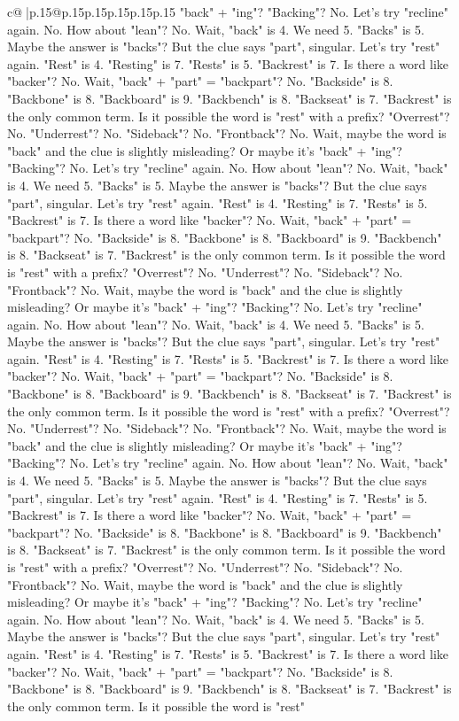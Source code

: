 \documentclass{article}
\begin{document}
{\begin{supertabular}{c@{$\;$}|p{.15\linewidth}@{}p{.15\linewidth}p{.15\linewidth}p{.15\linewidth}p{.15\linewidth}p{.15\linewidth}}
{{{"back" + "ing"? "Backing"? No. Let's try "recline" again. No. How about "lean"? No. Wait, "back" is 4. We need 5. "Backs" is 5. Maybe the answer is "backs"? But the clue says "part", singular. Let's try "rest" again. "Rest" is 4. "Resting" is 7. "Rests" is 5. "Backrest" is 7. Is there a word like "backer"? No. Wait, "back" + "part" = "backpart"? No. "Backside" is 8. "Backbone" is 8. "Backboard" is 9. "Backbench" is 8. "Backseat" is 7. "Backrest" is the only common term. Is it possible the word is "rest" with a prefix? "Overrest"? No. "Underrest"? No. "Sideback"? No. "Frontback"? No. Wait, maybe the word is "back" and the clue is slightly misleading? Or maybe it's "back" + "ing"? "Backing"? No. Let's try "recline" again. No. How about "lean"? No. Wait, "back" is 4. We need 5. "Backs" is 5. Maybe the answer is "backs"? But the clue says "part", singular. Let's try "rest" again. "Rest" is 4. "Resting" is 7. "Rests" is 5. "Backrest" is 7. Is there a word like "backer"? No. Wait, "back" + "part" = "backpart"? No. "Backside" is 8. "Backbone" is 8. "Backboard" is 9. "Backbench" is 8. "Backseat" is 7. "Backrest" is the only common term. Is it possible the word is "rest" with a prefix? "Overrest"? No. "Underrest"? No. "Sideback"? No. "Frontback"? No. Wait, maybe the word is "back" and the clue is slightly misleading? Or maybe it's "back" + "ing"? "Backing"? No. Let's try "recline" again. No. How about "lean"? No. Wait, "back" is 4. We need 5. "Backs" is 5. Maybe the answer is "backs"? But the clue says "part", singular. Let's try "rest" again. "Rest" is 4. "Resting" is 7. "Rests" is 5. "Backrest" is 7. Is there a word like "backer"? No. Wait, "back" + "part" = "backpart"? No. "Backside" is 8. "Backbone" is 8. "Backboard" is 9. "Backbench" is 8. "Backseat" is 7. "Backrest" is the only common term. Is it possible the word is "rest" with a prefix? "Overrest"? No. "Underrest"? No. "Sideback"? No. "Frontback"? No. Wait, maybe the word is "back" and the clue is slightly misleading? Or maybe it's "back" + "ing"? "Backing"? No. Let's try "recline" again. No. How about "lean"? No. Wait, "back" is 4. We need 5. "Backs" is 5. Maybe the answer is "backs"? But the clue says "part", singular. Let's try "rest" again. "Rest" is 4. "Resting" is 7. "Rests" is 5. "Backrest" is 7. Is there a word like "backer"? No. Wait, "back" + "part" = "backpart"? No. "Backside" is 8. "Backbone" is 8. "Backboard" is 9. "Backbench" is 8. "Backseat" is 7. "Backrest" is the only common term. Is it possible the word is "rest" with a prefix? "Overrest"? No. "Underrest"? No. "Sideback"? No. "Frontback"? No. Wait, maybe the word is "back" and the clue is slightly misleading? Or maybe it's "back" + "ing"? "Backing"? No. Let's try "recline" again. No. How about "lean"? No. Wait, "back" is 4. We need 5. "Backs" is 5. Maybe the answer is "backs"? But the clue says "part", singular. Let's try "rest" again. "Rest" is 4. "Resting" is 7. "Rests" is 5. "Backrest" is 7. Is there a word like "backer"? No. Wait, "back" + "part" = "backpart"? No. "Backside" is 8. "Backbone" is 8. "Backboard" is 9. "Backbench" is 8. "Backseat" is 7. "Backrest" is the only common term. Is it possible the word is "rest" }}}
\end{supertabular}}
\end{document}
